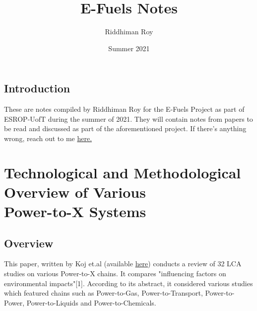 \documentclass[a4paper]{article}
\title{
    \vspace{5em}
    \textbf{\huge E-Fuels Notes}
    \large}
\author{Riddhiman Roy}
\date{Summer 2021}
\begin{document}
\maketitle
\thispagestyle{empty}

\setcounter{page}{0}

\begin{centering}
\section*{Introduction}
These are notes compiled by Riddhiman Roy for the E-Fuels Project as part of ESROP-UofT during the summer of 2021. They will contain notes from papers to be read and discussed as part of the aforementioned project. If there's anything wrong, reach out to me \href{https://riddhimanroy.com/contact.html}{here.}
\end{centering}

\tableofcontents
\pagebreak

\section{Technological and Methodological Overview of Various\\ Power-to-X Systems}
\subsection{Overview}
This paper, written by Koj et.al (available \href{https://www.sciencedirect.com/science/article/pii/S1364032119304228}{here}) conducts a review of 32 LCA studies on various Power-to-X chains. It compares "influencing factors on environmental impacts"[1]. According to its abstract, it considered various studies which featured chains such as Power-to-Gas, Power-to-Transport, Power-to-Power, Power-to-Liquids and Power-to-Chemicals.
\end{document}
